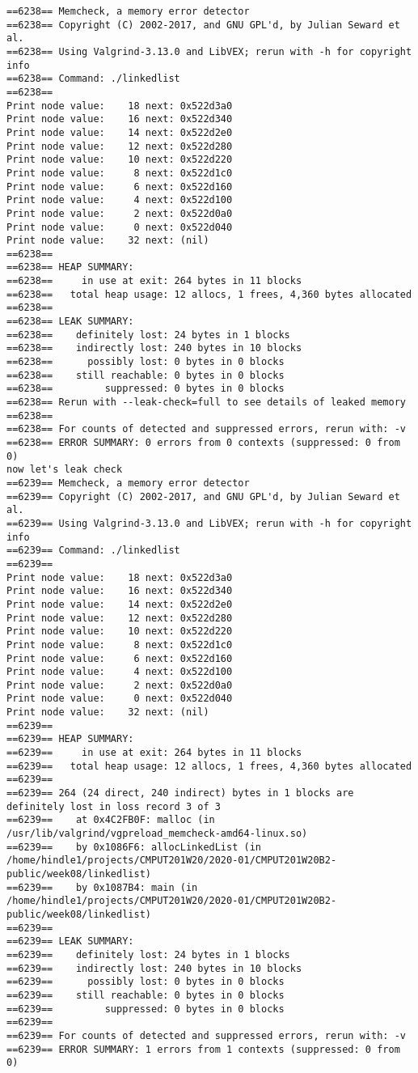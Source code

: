 \documentclass[11pt]{article}
\begin{document}
\begin{verbatim}
==6238== Memcheck, a memory error detector
==6238== Copyright (C) 2002-2017, and GNU GPL'd, by Julian Seward et al.
==6238== Using Valgrind-3.13.0 and LibVEX; rerun with -h for copyright info
==6238== Command: ./linkedlist
==6238== 
Print node value:    18 next: 0x522d3a0
Print node value:    16 next: 0x522d340
Print node value:    14 next: 0x522d2e0
Print node value:    12 next: 0x522d280
Print node value:    10 next: 0x522d220
Print node value:     8 next: 0x522d1c0
Print node value:     6 next: 0x522d160
Print node value:     4 next: 0x522d100
Print node value:     2 next: 0x522d0a0
Print node value:     0 next: 0x522d040
Print node value:    32 next: (nil)
==6238== 
==6238== HEAP SUMMARY:
==6238==     in use at exit: 264 bytes in 11 blocks
==6238==   total heap usage: 12 allocs, 1 frees, 4,360 bytes allocated
==6238== 
==6238== LEAK SUMMARY:
==6238==    definitely lost: 24 bytes in 1 blocks
==6238==    indirectly lost: 240 bytes in 10 blocks
==6238==      possibly lost: 0 bytes in 0 blocks
==6238==    still reachable: 0 bytes in 0 blocks
==6238==         suppressed: 0 bytes in 0 blocks
==6238== Rerun with --leak-check=full to see details of leaked memory
==6238== 
==6238== For counts of detected and suppressed errors, rerun with: -v
==6238== ERROR SUMMARY: 0 errors from 0 contexts (suppressed: 0 from 0)
now let's leak check
==6239== Memcheck, a memory error detector
==6239== Copyright (C) 2002-2017, and GNU GPL'd, by Julian Seward et al.
==6239== Using Valgrind-3.13.0 and LibVEX; rerun with -h for copyright info
==6239== Command: ./linkedlist
==6239== 
Print node value:    18 next: 0x522d3a0
Print node value:    16 next: 0x522d340
Print node value:    14 next: 0x522d2e0
Print node value:    12 next: 0x522d280
Print node value:    10 next: 0x522d220
Print node value:     8 next: 0x522d1c0
Print node value:     6 next: 0x522d160
Print node value:     4 next: 0x522d100
Print node value:     2 next: 0x522d0a0
Print node value:     0 next: 0x522d040
Print node value:    32 next: (nil)
==6239== 
==6239== HEAP SUMMARY:
==6239==     in use at exit: 264 bytes in 11 blocks
==6239==   total heap usage: 12 allocs, 1 frees, 4,360 bytes allocated
==6239== 
==6239== 264 (24 direct, 240 indirect) bytes in 1 blocks are definitely lost in loss record 3 of 3
==6239==    at 0x4C2FB0F: malloc (in /usr/lib/valgrind/vgpreload_memcheck-amd64-linux.so)
==6239==    by 0x1086F6: allocLinkedList (in /home/hindle1/projects/CMPUT201W20/2020-01/CMPUT201W20B2-public/week08/linkedlist)
==6239==    by 0x1087B4: main (in /home/hindle1/projects/CMPUT201W20/2020-01/CMPUT201W20B2-public/week08/linkedlist)
==6239== 
==6239== LEAK SUMMARY:
==6239==    definitely lost: 24 bytes in 1 blocks
==6239==    indirectly lost: 240 bytes in 10 blocks
==6239==      possibly lost: 0 bytes in 0 blocks
==6239==    still reachable: 0 bytes in 0 blocks
==6239==         suppressed: 0 bytes in 0 blocks
==6239== 
==6239== For counts of detected and suppressed errors, rerun with: -v
==6239== ERROR SUMMARY: 1 errors from 1 contexts (suppressed: 0 from 0)
\end{verbatim}
\end{document}
